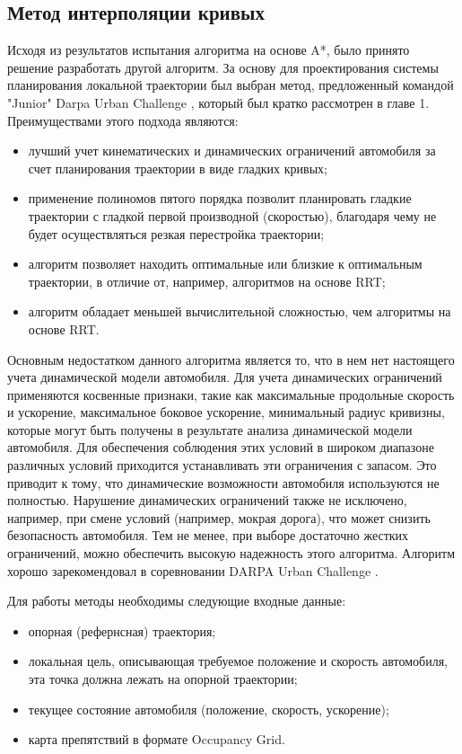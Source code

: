 \subsection{Метод интерполяции кривых}
Исходя из результатов испытания алгоритма на основе A*, было принято решение разработать другой алгоритм. За основу для
проектирования системы планирования локальной траектории был выбран метод, предложенный командой "Junior" Darpa
Urban Challenge \cite{darpa_junior}, который был кратко рассмотрен в главе 1. Преимуществами этого подхода
являются:
\begin{itemize}
      \item лучший учет кинематических и динамических ограничений автомобиля за счет планирования траектории в
            виде гладких кривых;
      \item применение полиномов пятого порядка позволит планировать гладкие траектории с гладкой первой производной
            (скоростью), благодаря чему не будет осуществляться резкая перестройка траектории;
      \item алгоритм позволяет находить оптимальные или близкие к оптимальным траектории, в отличие от, например,
            алгоритмов на основе RRT;
      \item алгоритм обладает меньшей вычислительной сложностью, чем алгоритмы на основе RRT.
\end{itemize}

Основным недостатком данного алгоритма является то, что в нем нет настоящего учета динамической модели автомобиля.
Для учета динамических ограничений применяются косвенные признаки, такие как максимальные продольные скорость и ускорение,
максимальное боковое ускорение, минимальный радиус кривизны, которые могут быть получены в результате анализа динамической
модели автомобиля. Для обеспечения соблюдения этих условий в широком диапазоне различных условий приходится устанавливать
эти ограничения с запасом. Это приводит к тому, что динамические возможности автомобиля используются не полностью.
Нарушение динамических ограничений также не исключено, например, при смене условий (например, мокрая дорога), что
может снизить безопасность автомобиля. Тем не менее, при выборе достаточно жестких ограничений, можно обеспечить
высокую надежность этого алгоритма. Алгоритм хорошо зарекомендовал в соревновании DARPA Urban Challenge \cite{darpa_junior}.

Для работы методы необходимы следующие входные данные:
\begin{itemize}
      \item опорная (рефернсная) траектория;
      \item локальная цель, описывающая требуемое положение и скорость автомобиля, эта точка должна
            лежать на опорной траектории;
      \item текущее состояние автомобиля (положение, скорость, ускорение);
      \item карта препятствий в формате Occupancy Grid.
\end{itemize}

